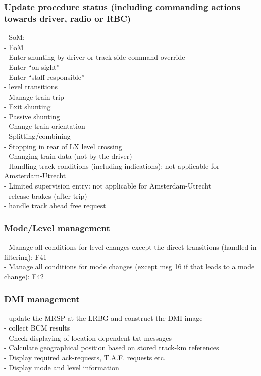 \documentclass{template/openetcs_report}
\begin{document}
\subsubsection{Update procedure status (including commanding actions towards driver, radio or RBC)}
- SoM:\\ 
- EoM\\
- Enter shunting by driver or track side command
override\\
- Enter “on sight”\\ 
- Enter “staff responsible”\\
- level transitions\\
- Manage train trip\\
- Exit shunting\\
- Passive shunting\\
- Change train orientation\\
- Splitting/combining\\
- Stopping in rear of LX level crossing\\
- Changing train data (not by the driver)\\
- Handling track conditions (including indications):  not applicable for Amsterdam-Utrecht\\
- Limited supervision entry:  not applicable for Amsterdam-Utrecht\\
- release brakes (after trip)\\
- handle track ahead free request\\

\subsubsection{Mode/Level management}
- Manage all conditions for level changes except the direct transitions (handled in filtering): F41\\
- Manage all conditions for mode changes (except msg 16 if that leads to a mode change): F42\\

\subsubsection{\gls{DMI} management}
- update the MRSP at the LR\gls{BG} and construct the \gls{DMI} image\\
- collect BCM results\\
- Check displaying of location dependent txt messages\\
- Calculate geographical position based on stored track-km references\\
- Display required ack-requests, T.A.F. requests etc.\\
- Display mode and level information\\
\end{document}
